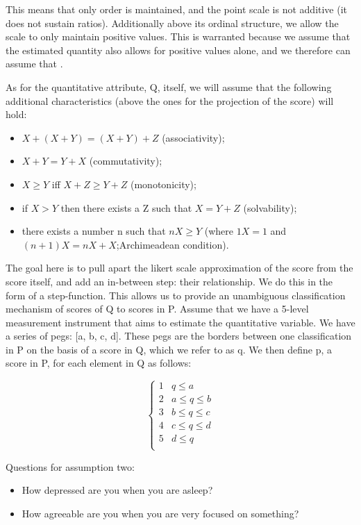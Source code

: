 \documentclass[utf8]{FrontiersinVancouver}
\begin{document}
This means that only order is maintained, and the point scale is not additive (it does not sustain ratios). Additionally above its ordinal structure, we allow the scale to only maintain positive values. This is warranted because we assume that the estimated quantity also allows for positive values alone, and we therefore can assume that . 

As for the quantitative attribute, Q,  itself, we will assume that the following additional characteristics (above the ones for the projection of the score) will hold:

\begin{itemize}
    \item $X + (X + Y) = (X + Y) + Z$ (associativity);
    \item $X + Y = Y + X$ (commutativity);
    \item $X \geq Y$ iff $X + Z \geq Y + Z$ (monotonicity);
    \item if $X > Y$ then there exists a Z such that $X = Y + Z$ (solvability);
    \item there exists a number n such that $nX \geq Y$ (where $1X = 1$ and $(n + 1) X = nX + X$;\@ Archimeadean condition).
\end{itemize}

The goal here is to pull apart the likert scale approximation of the score from the score itself, and add an in-between step: their relationship. We do this in the form of a step-function. This allows us to provide an unambiguous classification mechanism of scores of Q to scores in P. Assume that we have a 5-level measurement instrument that aims to estimate the quantitative variable. We have a series of pegs: [a, b, c, d]. These pegs are the borders between one classification in P on the basis of a score in Q, which we refer to as q. We then define p, a score in P, for each element in Q as follows: 

\[ \begin{cases} 
    1 & q \leq a \\
    2 & a \leq q \leq b\\
    3 & b \leq q \leq c\\
    4 & c \leq q \leq d\\
    5 & d \leq q\\
 \end{cases}
\]

\begin{framed}
    Questions for assumption two:
    \begin{itemize}
        \item How depressed are you when you are asleep?
        \item How agreeable are you when you are very focused on something?
    \end{itemize}
\end{framed}
\end{document}
